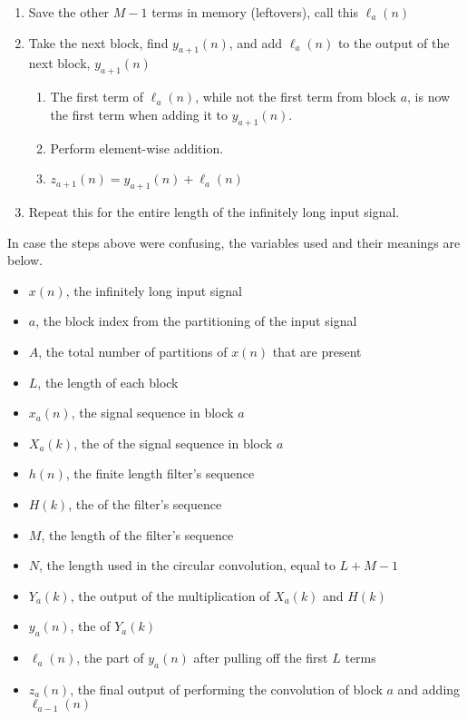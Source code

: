 \begin{enumerate}[noitemsep]
\item Save the other $M-1$ terms in memory (leftovers), call this $\ell_{a}(n)$
\item Take the next block, find $y_{a+1}(n)$, and add $\ell_{a}(n)$ to the output of the next block, $y_{a+1}(n)$
  \begin{enumerate}[noitemsep]
  \item The first term of $\ell_{a}(n)$, while not the first term from block $a$, is now the first term when adding it to $y_{a+1}(n)$.
  \item Perform element-wise addition.
  \item $z_{a+1}(n) = y_{a+1}(n) + \ell_{a}(n)$
  \end{enumerate}
\item Repeat this for the entire length of the infinitely long input signal.
\end{enumerate}

\begin{remark*}
  In case the steps above were confusing, the variables used and their meanings are below.
  \begin{itemize}[noitemsep]
  \item $x(n)$, the infinitely long input signal
  \item $a$, the block index from the partitioning of the input signal
  \item $A$, the total number of partitions of $x(n)$ that are present
  \item $L$, the length of each block
  \item $x_{a}(n)$, the signal sequence in block $a$
  \item $X_{a}(k)$, the  of the signal sequence in block $a$
  \item $h(n)$, the finite length filter's sequence
  \item $H(k)$, the  of the filter's sequence
  \item $M$, the length of the filter's sequence
  \item $N$, the length used in the circular convolution, equal to $L+M-1$
  \item $Y_{a}(k)$, the output of the multiplication of $X_{a}(k)$ and $H(k)$
  \item $y_{a}(n)$, the  of $Y_{a}(k)$
  \item $\ell_{a}(n)$, the part of $y_{a}(n)$ after pulling off the first $L$ terms
  \item $z_{a}(n)$, the final output of performing the convolution of block $a$ and adding $\ell_{a-1}(n)$
  \end{itemize}
\end{remark*}

